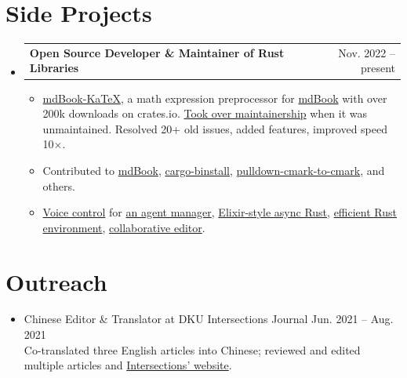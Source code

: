 \documentclass[letterpaper,11pt]{article}
\makeatletter
\newcommand{\CVItem}[1]{
  \item{\small
    {#1}
  }
}
\newcommand{\CVSubheadingFrame}[1]{
  \item
    \begin{tabular*}{0.97\textwidth}[t]{l@{\extracolsep{\fill}}r}
        #1
    \end{tabular*}
}
\newcommand{\CVSubHeadingListStart}{\begin{itemize}[leftmargin=1.2em, label={}]}
\newcommand{\CVSubHeadingListEnd}{\end{itemize}}
\newcommand{\CVItemListStart}{\begin{itemize}}
\newcommand{\CVItemListEnd}{\end{itemize}}
\newcommand{\uhref}[2]{\href{#1}{\textcolor{darkbluepurple}{#2}}}
\makeatother
\begin{document}
\section{Side Projects}
\CVSubHeadingListStart
\CVSubheadingFrame
{\textbf{Open Source Developer \& Maintainer of Rust Libraries}&
    Nov. 2022 -- present
}
\CVItemListStart
\CVItem
{\uhref{https://github.com/lzanini/mdbook-katex}{mdBook-KaTeX}, a math expression preprocessor for
    \uhref{https://github.com/rust-lang/mdBook}{mdBook} with
    over 200k downloads on crates.io.
    \uhref{https://github.com/lzanini/mdbook-KaTeX/issues/37}{Took over
    maintainership} when it was unmaintained.
    Resolved 20+ old issues, added features, improved speed 10$\times$.
}
\CVItem
{Contributed to
    \uhref{https://github.com/rust-lang/mdBook}{mdBook},
    \uhref{https://github.com/cargo-bins/cargo-binstall}{cargo-binstall},
    \uhref{https://github.com/Byron/pulldown-cmark-to-cmark}{pulldown-cmark-to-cmark},
    and others.
}
\CVItem
{
\uhref{https://sichangheagentvoicechat.github.io/}{Voice control} for 
    \uhref{https://github.com/SichangHe/agent_manager}{an agent manager},
    \uhref{https://github.com/SichangHe/tokio_gen_server}{Elixir-style async Rust},
    \uhref{https://github.com/SichangHe/rust_build_eval}{efficient Rust environment},
    \uhref{https://github.com/SichangHe/TeamTypeV}{collaborative editor}.
}
\CVItemListEnd

\CVSubHeadingListEnd

\section{Outreach}
\begin{itemize}
    \item Chinese Editor \& Translator at DKU Intersections Journal\hfill
    Jun. 2021 -- Aug. 2021\\{\small
    Co-translated three English articles into Chinese;
    reviewed and edited multiple articles and
    \uhref{https://sites.duke.edu/intersections/}{Intersections' website}.
    }
\end{itemize}
\end{document}
